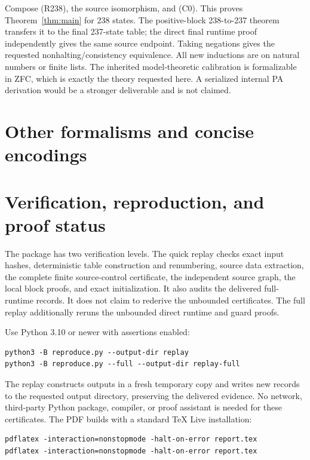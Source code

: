 \documentclass[11pt,letterpaper]{article}
\theoremstyle{definition}\newtheorem{definition}[theorem]{Definition}
\begin{document}
Compose (R238), the source isomorphism, and (C0).  This proves
Theorem~\ref{thm:main} for 238 states.
\ifFurtherReduction
The positive-block 238-to-237 theorem transfers it to the final 237-state
table; the direct final runtime proof independently gives the same
source endpoint.
\fi
Taking negations gives the requested nonhalting/consistency equivalence.
All new inductions are on natural numbers or finite lists.  The inherited
model-theoretic calibration is formalizable in ZFC, which is exactly the
theory requested here.  A serialized internal PA derivation would be a
stronger deliverable and is not claimed.

\section{Other formalisms and concise encodings}
\label{sec:alternatives}



\section{Verification, reproduction, and proof status}

The package has two verification levels.  The quick replay checks exact
input hashes, deterministic table construction and renumbering, source
data extraction, the complete finite source-control certificate, the
independent source graph, the local block proofs, and exact initialization.
It also audits the delivered full-runtime records.  It does not claim to
rederive the unbounded certificates.  The full replay additionally reruns
the unbounded direct runtime and guard proofs.

Use Python 3.10 or newer with assertions enabled:
\begin{verbatim}
python3 -B reproduce.py --output-dir replay
python3 -B reproduce.py --full --output-dir replay-full
\end{verbatim}
The replay constructs outputs in a fresh temporary copy and writes new
records to the requested output directory, preserving the delivered
evidence.  No network, third-party Python package, compiler, or proof
assistant is needed for these certificates.  The PDF builds with a
standard TeX Live installation:
\begin{verbatim}
pdflatex -interaction=nonstopmode -halt-on-error report.tex
pdflatex -interaction=nonstopmode -halt-on-error report.tex
\end{verbatim}
\end{document}
